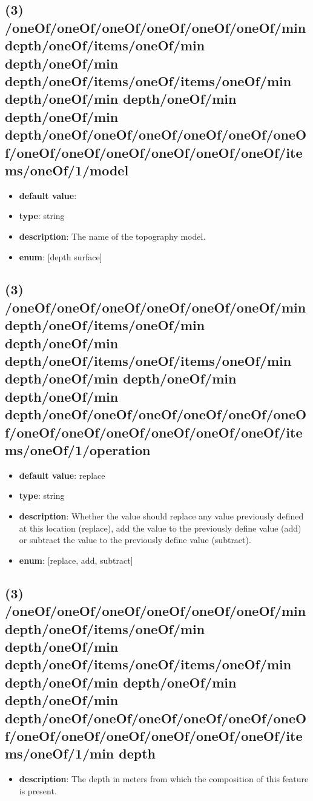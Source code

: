 \subsection{(3) /oneOf/oneOf/oneOf/oneOf/oneOf/oneOf/min depth/oneOf/items/oneOf/min depth/oneOf/min depth/oneOf/items/oneOf/items/oneOf/min depth/oneOf/min depth/oneOf/min depth/oneOf/min depth/oneOf/oneOf/oneOf/oneOf/oneOf/oneOf/oneOf/oneOf/oneOf/oneOf/oneOf/oneOf/items/oneOf/1/model}
\begin{itemize}[leftmargin=3em]\item {\bf default value}: 
\item {\bf type}: string
\item {\bf description}: The name of the topography model.
\item {\bf enum}: [depth surface]\end{itemize}\subsection{(3) /oneOf/oneOf/oneOf/oneOf/oneOf/oneOf/min depth/oneOf/items/oneOf/min depth/oneOf/min depth/oneOf/items/oneOf/items/oneOf/min depth/oneOf/min depth/oneOf/min depth/oneOf/min depth/oneOf/oneOf/oneOf/oneOf/oneOf/oneOf/oneOf/oneOf/oneOf/oneOf/oneOf/oneOf/items/oneOf/1/operation}
\begin{itemize}[leftmargin=3em]\item {\bf default value}: replace
\item {\bf type}: string
\item {\bf description}: Whether the value should replace any value previously defined at this location (replace), add the value to the previously define value (add) or subtract the value to the previously define value (subtract).
\item {\bf enum}: [replace, add, subtract]\end{itemize}\subsection{(3) /oneOf/oneOf/oneOf/oneOf/oneOf/oneOf/min depth/oneOf/items/oneOf/min depth/oneOf/min depth/oneOf/items/oneOf/items/oneOf/min depth/oneOf/min depth/oneOf/min depth/oneOf/min depth/oneOf/oneOf/oneOf/oneOf/oneOf/oneOf/oneOf/oneOf/oneOf/oneOf/oneOf/oneOf/items/oneOf/1/min depth}
\begin{itemize}[leftmargin=3em]\item {\bf description}: The depth in meters from which the composition of this feature is present.
\end{itemize}
